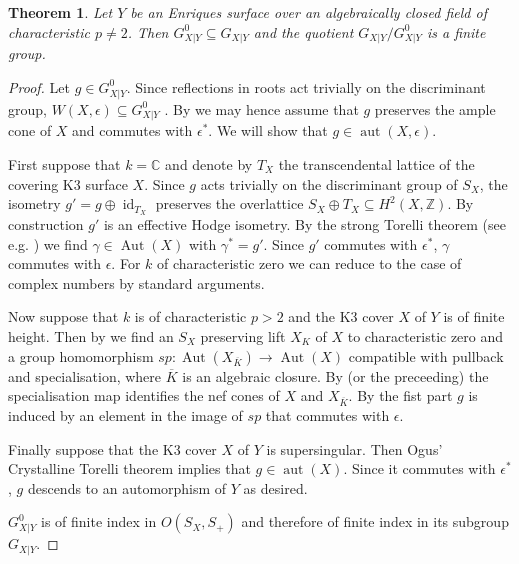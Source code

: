 \documentclass{amsart}
\theoremstyle{definition}
\theoremstyle{plain}
\newtheorem{theorem}[definition]{Theorem}
\DeclareMathOperator{\id}{id}
\DeclareMathOperator{\Aut}{Aut}
\DeclareMathOperator{\aut}{aut}
\newcommand{\CC}{\mathbb{C}}
\newcommand{\ZZ}{\mathbb{Z}}
\begin{document}
\begin{theorem}
Let $Y$ be an Enriques surface over an algebraically closed field of characteristic $p\neq 2$.
Then $G_{X|Y}^0 \subseteq G_{X|Y}$ and the quotient $G_{X|Y}/G_{X|Y}^0$ is a finite group.
\end{theorem}
\begin{proof}
Let $g \in G_{X|Y}^0$. Since reflections in roots act trivially on the discriminant group, $W(X,\epsilon) \subseteq G_{X|Y}^0$ . By  we may hence assume that $g$ preserves the ample cone of $X$ and commutes with $\epsilon^*$. We will show that $g \in \aut(X,\epsilon)$.

First suppose that $k=\CC$ and denote by $T_X$ the transcendental lattice of the covering K3 surface $X$. Since $g$ acts trivially on the discriminant group of $S_X$, the isometry $g'=g \oplus \id_{T_X}$ preserves the overlattice $S_X \oplus T_X \subseteq H^2(X,\ZZ)$. By construction $g'$ is an effective Hodge isometry. By the strong Torelli theorem (see e.g. \cite[VII (11.1)]{bhpv:compact-complex-surfaces}) we find $\gamma \in \Aut(X)$ with $\gamma^*=g'$. Since $g'$ commutes with $\epsilon^*$, $\gamma$ commutes with $\epsilon$.
For $k$ of characteristic zero we can reduce to the case of complex numbers by standard arguments.

Now suppose that $k$ is of characteristic $p>2$ and the K3 cover $X$ of $Y$ is of finite height.
Then by \cite[Theorem 2.1]{maulik} we find an $S_X$ preserving lift $X_K$ of $X$ to characteristic zero
and a group homomorphism $sp: \Aut(X_{\overline{K}}) \to \Aut(X)$ compatible with pullback and specialisation, where $\overline{K}$ is an algebraic closure.
By \cite[Corollary 2.4]{maulik} (or the preceeding) the specialisation map identifies the nef cones of $X$ and $X_{\overline{K}}$. By the fist part $g$ is induced by an element in the image of $sp$ that commutes with $\epsilon$.

Finally suppose that the K3 cover $X$ of $Y$ is supersingular.
Then Ogus' Crystalline Torelli theorem \cite[Theorem II' and Theorem II'']{ogus:83}\cite[Theorem 5.1.9 for p=3]{bragg-lieblich} implies that $g \in \aut(X)$.
Since it commutes with $\epsilon^*$, $g$ descends to an automorphism of $Y$ as desired.

$G_{X|Y}^0$ is of finite index in $O(S_X,S_+)$ and therefore of finite index in its subgroup $G_{X|Y}$.
\end{proof}
\end{document}
